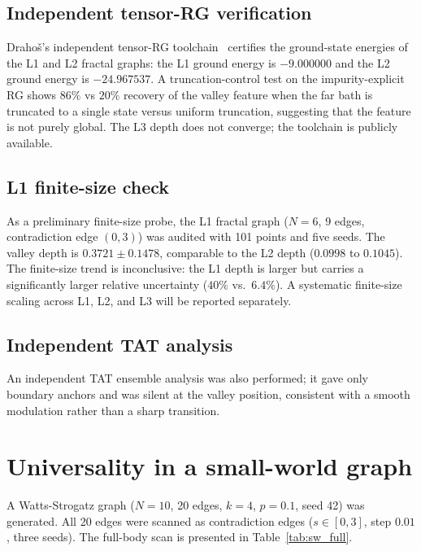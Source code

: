 \documentclass[aps,prb,reprint,superscriptaddress]{revtex4-2}
\begin{document}
\subsection{Independent tensor-RG verification}

Draho\v{s}'s independent tensor-RG toolchain~\cite{Drahos2026GitHub} certifies the ground-state energies of the L1 and L2 fractal graphs: the L1 ground energy is $-9.000000$ and the L2 ground energy is $-24.967537$. A truncation-control test on the impurity-explicit RG shows $86\%$ vs $20\%$ recovery of the valley feature when the far bath is truncated to a single state versus uniform truncation, suggesting that the feature is not purely global. The L3 depth does not converge; the toolchain is publicly available.

\subsection{L1 finite-size check}

As a preliminary finite-size probe, the L1 fractal graph ($N=6$, 9 edges, contradiction edge $(0,3)$) was audited with 101 points and five seeds. The valley depth is $0.3721\pm0.1478$, comparable to the L2 depth ($0.0998$ to $0.1045$). The finite-size trend is inconclusive: the L1 depth is larger but carries a significantly larger relative uncertainty ($40\%$ vs.\ $6.4\%$). A systematic finite-size scaling across L1, L2, and L3 will be reported separately.

\subsection{Independent TAT analysis}

An independent TAT ensemble analysis was also performed; it gave only boundary anchors and was silent at the valley position, consistent with a smooth modulation rather than a sharp transition.

\section{Universality in a small-world graph}

A Watts-Strogatz graph ($N=10$, 20 edges, $k=4$, $p=0.1$, seed 42) was generated. All 20 edges were scanned as contradiction edges ($s\in[0,3]$, step $0.01$, three seeds). The full-body scan is presented in Table~\ref{tab:sw_full}.
\end{document}
